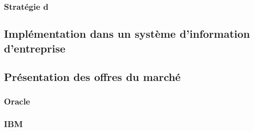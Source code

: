 \subsubsection{Stratégie d}

\subsection{Implémentation dans un système d'information d'entreprise}

\subsection{Présentation des offres du marché}

\subsubsection{Oracle}

\subsubsection{IBM}
